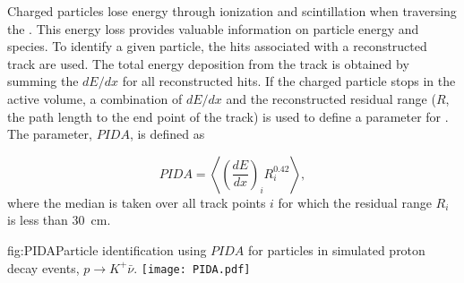 

Charged particles lose energy through ionization and scintillation when traversing the . This energy loss provides valuable information on particle energy and species. To identify a given particle, the hits associated with a reconstructed track are used.
The total energy deposition from the track is obtained by summing the $dE/dx$ for all reconstructed hits. 
If the charged particle stops in the \lartpc active volume, a combination of $dE/dx$ and the reconstructed residual range ($R$, the path length to the end point of the track) is used to define a parameter for .  The parameter, $PIDA$, %
is defined as  

\begin{equation}
PIDA = \left\langle \left(\frac{dE}{dx}\right)_{i}R^{0.42}_{i}\right\rangle,\label{eqn:PIDA}
\end{equation}
where the median is taken over all track points $i$ for which the residual range $R_i$ is less than 30~cm.

\begin{dunefigure}{fig:PIDA}{Particle identification using $PIDA$ for particles in simulated proton decay events, $p\rightarrow K^{+} \bar{\nu}$.}
\texttt{[image: PIDA.pdf]}
\end{dunefigure}


